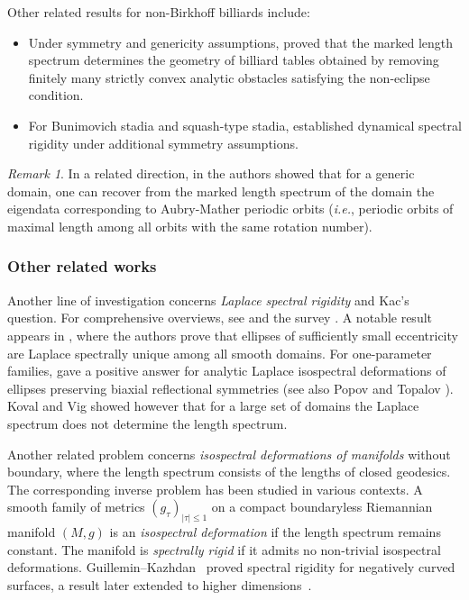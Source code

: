 \documentclass[12pt, openany]{amsart}
\theoremstyle{definition}
\theoremstyle{remark}
\theoremstyle{remark}
\newtheorem{remark}[theorem]{Remark}
\theoremstyle{theorem}
\theoremstyle{theorem}
\theoremstyle{theorem}
\theoremstyle{theorem}
\begin{document}
Other related results for non-Birkhoff billiards include:
\begin{itemize}
    \item Under symmetry and genericity assumptions, \cite{DKL} proved that the marked length spectrum determines the geometry of billiard tables obtained by removing finitely many strictly convex analytic obstacles satisfying the non-eclipse condition.
    \item For Bunimovich stadia and squash-type stadia, \cite{CKZ} established dynamical spectral rigidity under additional symmetry assumptions.
\end{itemize}


\begin{remark}
In a related direction, in \cite{HKS_Duke} the authors showed that for a generic domain, one can recover from the marked length spectrum of the domain the eigendata corresponding to Aubry-Mather periodic orbits ({\it i.e.}, periodic orbits of maximal length among all orbits with the same rotation number).
\end{remark}


\medskip

\subsubsection{Other related works}
Another line of investigation concerns \textit{Laplace spectral rigidity} and Kac's question. For comprehensive overviews, see \cite{HezariZelditch} and the survey \cite{ZelditchSurvey15}. A notable result appears in \cite{HZ2}, where the authors prove that ellipses of sufficiently small eccentricity are Laplace spectrally unique among all smooth domains. For one-parameter families, \cite{HezariZelditch} gave a positive answer for analytic Laplace isospectral deformations of ellipses preserving biaxial reflectional symmetries (see also Popov and Topalov \cite{PopovTopalov1}).
Koval and Vig \cite{KovalVig} showed however that for a large set of domains the Laplace spectrum does not determine the length spectrum.

Another related problem concerns \textit{isospectral deformations of manifolds} without boundary, where the length spectrum consists of the lengths of closed geodesics. The corresponding inverse problem has been studied in various contexts. A smooth family of metrics $(g_\tau)_{|\tau|\leq1}$ on a compact boundaryless Riemannian manifold $(M,g)$ is an \textit{isospectral deformation} if the length spectrum remains constant. The manifold is \textit{spectrally rigid} if it admits no non-trivial isospectral deformations.
Guillemin--Kazhdan~\cite{GuilleminKazhdan} proved spectral rigidity for negatively curved surfaces, a result later extended to higher dimensions~\cite{CS}.
\end{document}
